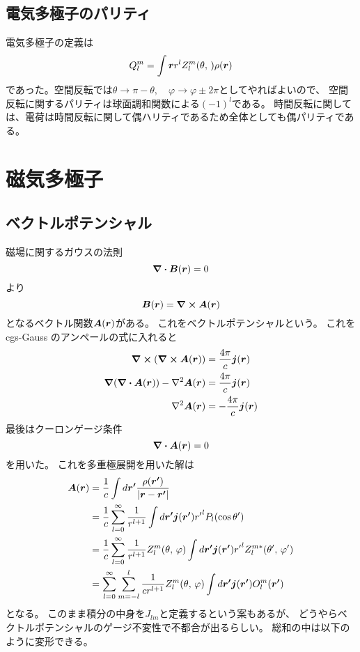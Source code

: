 \documentclass[../../master.tex]{subfiles}
\begin{document}
\subsection{電気多極子のパリティ}
電気多極子の定義は
\begin{equation}
    Q_l^m = \int \vb*{r} r^l Z_l^m(\theta,\,)\rho(\vb*{r})
\end{equation}
であった。空間反転では\(\theta\rightarrow\pi-\theta,\quad\varphi\rightarrow\varphi\pm 2\pi\)としてやればよいので、
空間反転に関するパリティは球面調和関数による\((-1)^l\)である。
時間反転に関しては、電荷は時間反転に関して偶ハリティであるため全体としても偶パリティである。

\section{磁気多極子}
\subsection{ベクトルポテンシャル}
磁場に関するガウスの法則
\begin{equation}
    \div \vb*{B}(\vb*{r}) = 0
\end{equation}
より
\begin{equation}
    \vb*{B}(\vb*{r}) = \curl \vb*{A}(\vb*{r})
\end{equation}
となるベクトル関数\(\vb*{A}(\vb*{r})\)がある。
これをベクトルポテンシャルという。
これを cgs-Gauss のアンペールの式に入れると
\begin{align}
    \curl (\curl \vb*{A}(\vb*{r})) &= \frac{4\pi}{c} \vb*{j}(\vb*{r})\\
    \grad(\div\vb*{A}(\vb*{r})) - \laplacian \vb*{A}(\vb*{r}) &= \frac{4\pi}{c}\vb*{j}(\vb*{r})\\
    \laplacian \vb*{A}(\vb*{r}) &= -\frac{4\pi}{c}\vb*{j}(\vb*{r})
\end{align}
最後はクーロンゲージ条件
\begin{equation}
    \div \vb*{A}(\vb*{r})=0
\end{equation}
を用いた。
これを多重極展開を用いた解は
\begin{align}
    \vb*{A}(\vb*{r})
    &= \frac{1}{c}\int d\vb*{r'} \frac{\rho(\vb*{r'})}{\abs{\vb*{r}-\vb*{r'}}}\\
    &= \frac{1}{c}\sum_{l=0}^{\infty} \frac{1}{r^{l+1}}\int d\vb*{r'} \vb*{j}(\vb*{r'}){r'}^l P_l(\cos\theta')\\
    &= \frac{1}{c}\sum_{l=0}^{\infty} \frac{1}{r^{l+1}} Z_l^m(\theta,\,\varphi)\int d\vb*{r'} \vb*{j}(\vb*{r'}){r'}^l Z_l^{m*}(\theta',\,\varphi')\\
    &= \sum_{l=0}^{\infty} \sum_{m=-l}^{l} \frac{1}{cr^{l+1}}Z_l^m(\theta,\,\varphi) \int d\vb*{r'} \vb*{j}(\vb*{r'}) O_l^{m}(\vb*{r'})
\end{align}
となる。
このまま積分の中身を\(J_{lm}\)と定義するという案もあるが、
どうやらベクトルポテンシャルのゲージ不変性で不都合が出るらしい\cite{Stefan2016}。
総和の中は以下のように変形できる。
\end{document}
